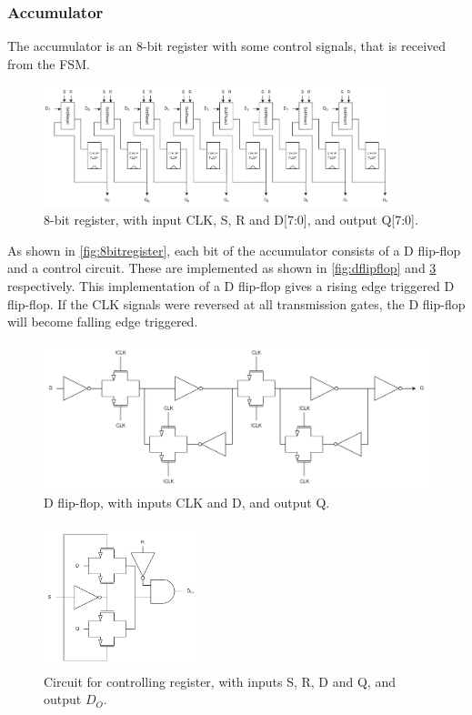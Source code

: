 \subsubsection{Accumulator}
\label{subsubsec:accumulator}
The accumulator is an 8-bit register with some control signals, that is received from the FSM. 

\begin{figure}[H]
    \centering
    \includegraphics[width=0.9\textwidth]{Figures/8bitRegister.png}
    \caption{8-bit register, with input CLK, S, R and D[7:0], and output Q[7:0].}
    \label{fig:8bitregister}
\end{figure}

As shown in \autoref{fig:8bitregister}, each bit of the accumulator consists of a D flip-flop and a control circuit. These are implemented as shown in \autoref{fig:dflipflop} \cite[p.18]{digital_design} and \ref{fig:setreset} respectively. This implementation of a D flip-flop gives a rising edge triggered D flip-flop. If the CLK signals were reversed at all transmission gates, the D flip-flop will become falling edge triggered.  

\begin{figure}[H]
    \centering
    \includegraphics[width=\textwidth]{Figures/D_Flip_Flop.png}
    \caption{D flip-flop, with inputs CLK and D, and output Q.}
    \label{fig:dflipflop}
\end{figure}

\begin{figure}[H]
    \centering
    \includegraphics[width=0.4\textwidth]{Figures/setReset.png}
    \caption{Circuit for controlling register, with inputs S, R, D and Q, and output $D_O$.}
    \label{fig:setreset}
\end{figure}

